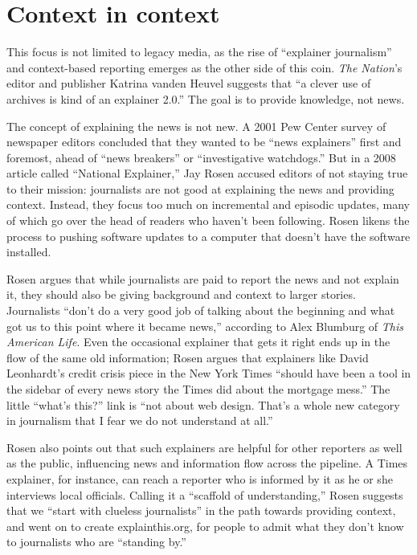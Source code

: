 \section{Context in context}

This focus is not limited to legacy media, as the rise of ``explainer journalism'' and context-based reporting emerges as the other side of this coin. \emph{The Nation}'s editor and publisher Katrina vanden Heuvel suggests that ``a clever use of archives is kind of an explainer 2.0.''\autocite{} The goal is to provide knowledge, not news.

The concept of explaining the news is not new. A 2001 Pew Center survey of newspaper editors concluded that they wanted to be ``news explainers'' first and foremost, ahead of ``news breakers'' or ``investigative watchdogs.'' But in a 2008 article called ``National Explainer,'' Jay Rosen accused editors of not staying true to their mission: journalists are not good at explaining the news and providing context. Instead, they focus too much on incremental and episodic updates, many of which go over the head of readers who haven't been following. Rosen likens the process to pushing software updates to a computer that doesn't have the software installed.

Rosen argues that while journalists are paid to report the news and not explain it, they should also be giving background and context to larger stories. Journalists ``don’t do a very good job of talking about the beginning and what got us to this point where it became news,'' according to Alex Blumburg of \emph{This American Life}. Even the occasional explainer that gets it right ends up in the flow of the same old information; Rosen argues that explainers like David Leonhardt's credit crisis piece in the New York Times ``should have been a tool in the sidebar of every news story the Times did about the mortgage mess.'' The little ``what's this?'' link is ``not about web design. That's a whole new category in journalism that I fear we do not understand at all.''

Rosen also points out that such explainers are helpful for other reporters as well as the public, influencing news and information flow across the pipeline. A Times explainer, for instance, can reach a reporter who is informed by it as he or she interviews local officials. Calling it a ``scaffold of understanding,'' Rosen suggests that we ``start with clueless journalists'' in the path towards providing context, and went on to create explainthis.org, for people to admit what they don't know to journalists who are ``standing by.''\autocite{rosen_2008}

